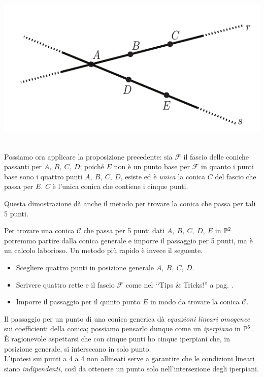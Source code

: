 \begin{demonstration}
\begin{minipage}{0.69\textwidth}
	\end{minipage}
	\begin{minipage}{0.30\textwidth}
		\includegraphics[trim=0cm 0cm 0cm 0cm,clip,scale=0.50]{images/fivepointconic2.pdf}
	\end{minipage}\\
	Possiamo ora applicare la proposizione precedente: sia $\mathcal{F}$ il fascio delle coniche passanti per $A,\ B,\ C,\ D$; poiché $E$ non è un punto base per $\mathcal{F}$ in quanto i punti base sono i quattro punti $A,\ B,\ C,\ D$, esiste ed è \textit{unica} la conica $C$ del fascio che passa per $E$. $C$ è l'unica conica che contiene i cinque punti.
\end{demonstration}
Questa dimostrazione dà anche il metodo per trovare la conica che passa per tali 5 punti.
\begin{tips}
	Per trovare una conica $\mathcal{C}$ che passa per 5 punti dati $A,\ B,\ C,\ D,\ E$ in $\proj[2]{\ }$ potremmo partire dalla conica generale e imporre il passaggio per 5 punti, ma è un calcolo laborioso. Un metodo più rapido è invece il seguente.
		\begin{itemize}
			\item	Scegliere quattro punti in posizione generale $A,\ B,\ C,\ D$.
			\item	Scrivere quattro rette e il fascio $\mathcal{F} $ come nel ‘‘Tips \& Tricks!'' a pag. \pageref{fascio coniche per 4 pt pos gen}.
			\item	Imporre il passaggio per il quinto punto $E$ in modo da trovare la conica $\mathcal{C}$.
		\end{itemize}
	\vspace{-3mm}
\end{tips}
\begin{observe}
	Il passaggio per un punto di una conica generica dà \textit{equazioni lineari omogenee} sui coefficienti della conica; possiamo pensarlo dunque come un \textit{iperpiano} in $\proj[5]{\ }$. È ragionevole aspettarsi che con cinque punti ho cinque iperpiani che, in posizione generale, si intersecano in solo punto.\\
	L'ipotesi sui punti a 4 a 4 non allineati serve a garantire che le condizioni lineari siano \textit{indipendenti}, così da ottenere un punto solo nell'intersezione degli iperpiani.
\end{observe}
